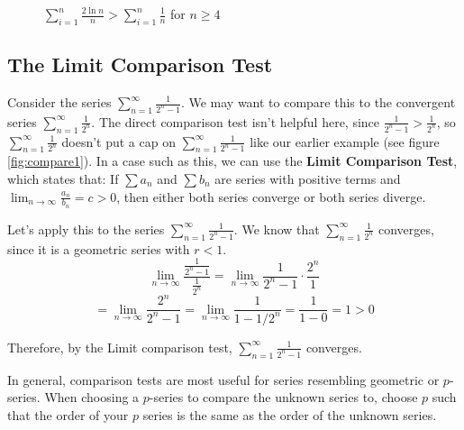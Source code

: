 \begin{figure}
    \centering
    \caption{$\sum_{i=1}^n \frac{2\ln{n}}{n} > \sum_{i=1}^n \frac{1}{n}$ 
    for $n \geq 4$}
    \label{fig:compare2}
\end{figure}

\subsection{The Limit Comparison Test}
Consider the series $\sum_{n=1}^\infty \frac{1}{2^n - 1}$. We may want to 
compare this to the convergent series $\sum_{n=1}^\infty \frac{1}{2^n}$. The 
direct comparison test isn't helpful here, since $\frac{1}{2^n - 1} > 
\frac{1}{2^n}$, so $\sum_{n=1}^\infty \frac{1}{2^n}$ doesn't put a cap on 
$\sum_{n=1}^\infty \frac{1}{2^n - 1}$ like our earlier example (see figure 
\ref{fig:compare1}). In a case such as this, we can use the \textbf{Limit 
Comparison Test}, which states that:
If $\sum a_n$ and $\sum b_n$ are series with positive terms and $\lim_{n \to 
\infty} \frac{a_n}{b_n} = c > 0$, then either both series converge or both 
series diverge.

Let's apply this to the series $\sum_{n=1}^\infty \frac{1}{2^n - 1}$. We know 
that $\sum_{n=1}^\infty \frac{1}{2^n}$ converges, since it is a geometric 
series with $r < 1$. 
$$\lim_{n \to \infty} \frac{\frac{1}{2^n - 1}}{\frac{1}{2^n}} = \lim_{n \to 
\infty} \frac{1}{2^n - 1} \cdot \frac{2^n}{1}$$
$$= \lim_{n \to \infty} \frac{2^n}{2^n - 1} = \lim_{n \to \infty} \frac{1}{1 - 
1/2^n} = \frac{1}{1-0} = 1 > 0$$

Therefore, by the Limit comparison test, $\sum_{n=1}^\infty \frac{1}{2^n - 1}$ 
converges.

In general, comparison tests are most useful for series resembling geometric 
or $p$-series. When choosing a $p$-series to compare the unknown series to, 
choose $p$ such that the order of your $p$ series is the same as the order of 
the unknown series.

